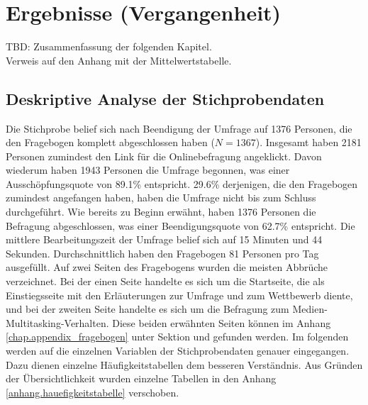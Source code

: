 %
%
\glsresetall
\let\raggedsection\centering
\chapter{Ergebnisse (Vergangenheit)}
\let\raggedsection\raggedright 
TBD: Zusammenfassung der folgenden Kapitel.\\
Verweis auf den Anhang mit der Mittelwertstabelle.

\section{Deskriptive Analyse der Stichprobendaten}
\label{label.stichprobe}
Die Stichprobe belief sich nach Beendigung der Umfrage auf 1376 Personen, die den Fragebogen komplett abgeschlossen haben ($N = 1367$). Insgesamt haben 2181 Personen zumindest den Link für die Onlinebefragung angeklickt. Davon wiederum haben 1943 Personen die Umfrage begonnen, was einer Ausschöpfungsquote von 89.1\% entspricht. 29.6\% derjenigen, die den Fragebogen zumindest angefangen haben, haben die Umfrage nicht bis zum Schluss durchgeführt. Wie bereits zu Beginn erwähnt, haben 1376 Personen die Befragung abgeschlossen, was einer Beendigungsquote von 62.7\% entspricht. Die mittlere Bearbeitungszeit der Umfrage belief sich auf 15 Minuten und 44 Sekunden. Durchschnittlich haben den Fragebogen 81 Personen pro Tag ausgefüllt. Auf zwei Seiten des Fragebogens wurden die meisten Abbrüche verzeichnet. Bei der einen Seite handelte es sich um die Startseite, die als Einstiegsseite mit den Erläuterungen zur Umfrage und zum Wettbewerb diente, und bei der zweiten Seite handelte es sich um die Befragung zum Medien-Multitasking-Verhalten. Diese beiden erwähnten Seiten können im Anhang \ref{chap.appendix_fragebogen} unter Sektion  und  gefunden werden. Im folgenden werden auf die einzelnen Variablen der Stichprobendaten genauer eingegangen. Dazu dienen einzelne Häufigkeitstabellen dem besseren Verständnis. Aus Gründen der Übersichtlichkeit wurden einzelne Tabellen in den Anhang \ref{anhang.hauefigkeitstabelle} verschoben.

